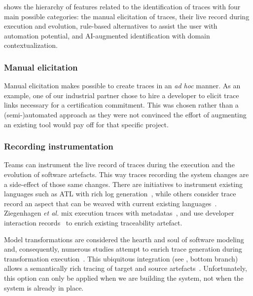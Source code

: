  shows the hierarchy of features related to the identification of traces with four main possible categories: 
the manual elicitation of traces, 
their live record during execution and evolution,
rule-based alternatives to assist the user with automation potential, 
and AI-augmented identification with domain contextualization.


\subsubsection{Manual elicitation} 
Manual elicitation makes possible to create traces in an \textit{ad hoc} manner. As an example, one of our industrial partner chose to hire a developer to elicit trace links necessary for a certification commitment. This was chosen rather than a (semi-)automated approach as they were not convinced the effort of augmenting an existing tool would pay off for that specific project. 

\subsubsection{Recording instrumentation} 
Teams can instrument the {live record} of traces during the execution and the evolution of software artefacts. This way traces recording the system changes are a side-effect of those same changes. There are initiatives to instrument existing languages such as ATL with rich log generation~\cite{Santiago_2013,la_Fosse_2018}, while others consider trace record an aspect that can be weaved with current existing languages~\cite{Pfeiffer_2014,Santiago_2013}. Ziegenhagen \textit{et al.} mix execution traces with metadatas~\cite{ziegenhagen2020-expanding-tracea-with-dynamic-tracing-data}, and use developer interaction records~\cite{ziegenhagen2019-developer-tool-interaction} to enrich existing traceability artefact.

Model transformations are considered the hearth and soul of software modeling and, consequently, numerous studies attempt to enrich trace generation during transformation execution~\cite{vara2014-traceability-in-MDD-MTransfo,Saada_2013,la_Fosse_2018}. This ubiquitous integration (see , bottom branch) allows a semantically rich tracing of target and source artefacts~\cite{paige2011-traces-in-moel-driven-engineering}. Unfortunately, this option can only be applied when we are building the system, not when the system is already in place.

